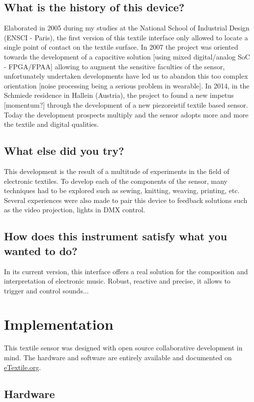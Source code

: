 \documentclass{sigchi-ext}
\begin{document}
\subsection{What is the history of this device?}
Elaborated in 2005 during my studies at the National School of Industrial Design (ENSCI - Paris), the first version of this textile interface only allowed to locate a single point of contact on the textile surface. In 2007 the project was oriented towards the development of a capacitive solution [using mixed digital/analog SoC - FPGA/FPAA] allowing to augment the sensitive faculties of the sensor, unfortunately undertaken developments have led us to abandon this too complex orientation [noise processing being a serious problem in wearable]. In 2014, in the Schmiede residence in Hallein (Austria), the project to found a new impetus [momentum?] through the development of a new piezoreistif textile based sensor. Today the development prospects multiply and the sensor adopts more and more the textile and digital qualities.


\subsection{What else did you try?}
This development is the result of a multitude of experiments in the field of electronic textiles. To develop each of the components of the sensor, many techniques had to be explored such as sewing, knitting, weaving, printing, etc. Several experiences were also made to pair this device to feedback solutions such as the video projection, lights in DMX control.


\subsection{How does this instrument satisfy what you wanted to do?}
In its current version, this interface offers a real solution for the composition and interpretation of electronic music. Robust, reactive and precise, it allows to trigger and control sounds...


\section{Implementation}

This textile sensor was  designed with open source collaborative development in mind. The hardware and software are entirely available and documented on \url{eTextile.org}.

\subsection{Hardware}
\end{document}
